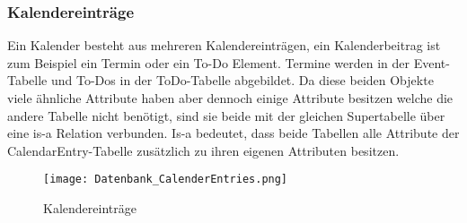 \subsubsection*{Kalendereinträge}
\label{ref:kalenderEintraege}
Ein Kalender besteht aus mehreren Kalendereinträgen, ein Kalenderbeitrag ist zum Beispiel ein Termin oder ein To-Do Element. Termine werden in der Event-Tabelle und To-Dos in der ToDo-Tabelle abgebildet. Da diese beiden Objekte viele ähnliche Attribute haben aber dennoch einige Attribute besitzen welche die andere Tabelle nicht benötigt, sind sie beide mit der gleichen Supertabelle über eine is-a Relation verbunden. Is-a bedeutet, dass beide Tabellen alle Attribute der CalendarEntry-Tabelle zusätzlich zu ihren eigenen Attributen besitzen.
\begin{figure}[H]
	\texttt{[image: Datenbank\_CalenderEntries.png]}
    \caption{Kalendereinträge}
    \label{fig:calendarEntries}
\end{figure}


	